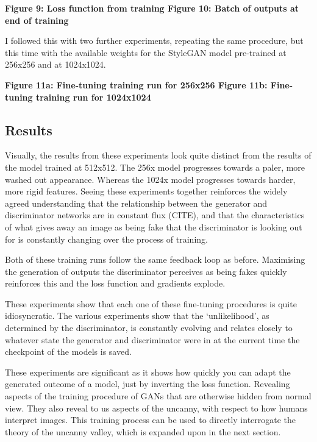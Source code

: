 \textbf{Figure 9: Loss function from training
Figure 10: Batch of outputs at end of training}

I followed this with two further experiments, repeating the same procedure, but this time with the available weights for the StyleGAN model pre-trained at 256x256 and at 1024x1024. 

\textbf{Figure 11a: Fine-tuning training run for 256x256
Figure 11b: Fine-tuning training run for 1024x1024}

\subsection{Results}

Visually, the results from these experiments look quite distinct from the results of the model trained at 512x512. 
The 256x model progresses towards a paler, more washed out appearance. Whereas the 1024x model progresses towards harder, more rigid features. 
Seeing these experiments together reinforces the widely agreed understanding that the relationship between the generator and discriminator networks are in constant flux (CITE), and that the characteristics of what gives away an image as being fake that the discriminator is looking out for is constantly changing over the process of training.  

Both of these training runs follow the same feedback loop as before. 
Maximising the generation of outputs the discriminator perceives as being fakes quickly reinforces this and the loss function and gradients explode.

These experiments show that each one of these fine-tuning procedures is quite idiosyncratic. 
The various experiments show that the ‘unlikelihood’, as determined by the discriminator, is constantly evolving and relates closely to whatever state the generator and discriminator were in at the current time the checkpoint of the models is saved. 

These experiments are significant as it shows how quickly you can adapt the generated outcome of a model, just by inverting the loss function. 
Revealing aspects of the training procedure of GANs that are otherwise hidden from normal view. 
They also reveal to us aspects of the uncanny, with respect to how humans interpret images.
This training process can be used to directly interrogate the theory of the uncanny valley, which is expanded upon in the next section. 

